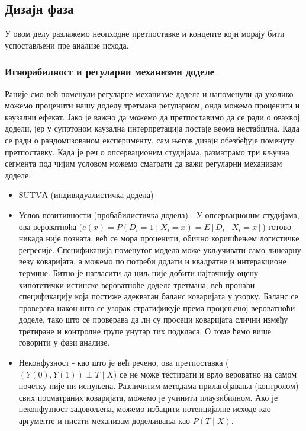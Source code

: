 \documentclass[12pt, a4paper]{article}
\begin{document}
\subsection{Дизајн фаза}
У овом делу разлажемо неопходне претпоставке и концепте који морају бити успостављени пре анализе исхода. 
\subsubsection{Игнорабилност и регуларни механизми доделе}
Раније смо већ поменули регуларне механизме доделе и напоменули да уколико можемо проценити нашу доделу третмана регуларном, онда можемо проценити и каузални ефекат. Јако је важно да можемо да претпоставимо да се ради о оваквој додели, јер у супртоном каузална интерпретација постаје веома нестабилна. Када се ради о рандомизованом експерименту, сам његов дизајн обезбеђује поменуту претпоставку. Када је реч о опсервационим студијама, разматрамо три кључна сегмента под чијим условом можемо сматрати да важи регуларни механизам доделе:

\begin{itemize}
  \item SUTVА (индивидуалистичка додела)
  \item Услов позитивности (пробабилистичка додела) -  У опсервационим студијама, ова вероватноћа ($e(x) = P(D_i = 1 \mid X_i = x) = E[D_i \mid X_i = x]$) готово никада није позната, већ се мора проценити, обично коришћењем логистичке регресије. Спецификација поменутог модела може укључивати само линеарну везу коваријата, а можемо по потреби додати и квадратне и интеракционе термине.  Битно је нагласити да циљ није добити најтачнију оцену хипотетички истинске вероватноће доделе третмана, већ пронаћи спецификацију која постиже адекватан баланс коваријата у узорку. Баланс се проверава након што се узорак стратификује према процењеној вероватноћи доделе, тако што се проверава да ли су просеци коваријата слични између третиране и контролне групе унутар тих подкласа. О томе ћемо више говорити у фази анализе.
  \item Неконфузност - као што је већ речено, ова претпоставка ($(Y(0), Y(1)) \perp T \mid X$) се не може тестирати и врло вероватно на самом почетку није ни испуњена. Различитим методама прилагођавања (контролом) свих посматраних коваријата, можемо је учинити плаузибилном. Ако је неконфузност задовољена, можемо избацити потенцијалне исходе као аргументе и писати механизам додељивања као  $P(T \mid X)$. 

\end{itemize}
\end{document}
